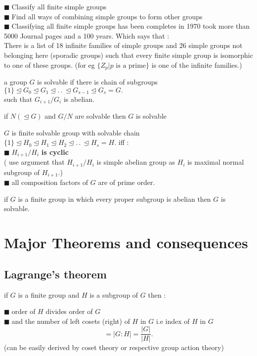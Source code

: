 \documentclass[11pt]{extarticle}
\newcommand{\w}[1]{\text{#1}}
\newcommand{\ck}{.\,.\,}
\newcommand{\snote}[1]{{\footnotesize(#1)}}
\newcommand{\y}{$\blacksquare\;$}
\newcommand{\tbx}[2][]{
	\begin{tcolorbox}[enhanced,breakable,size=small,colback=black!2!white,title={#1},arc is angular, arc=1.5mm,drop fuzzy shadow]
		#2
	\end{tcolorbox}
}
\begin{document}
\begin{multicols}{2}
{		
			\y  Classify all finite simple groups \\
			\y   Find all ways of combining simple groups to form other groups \\
			\y  Classifying all finite simple groups  has been completes in 1970 took more than 5000 Journal pages and a 100 years. Which says that : \\ 
			There is a list of 18 infinite families of simple groups and 26 simple groups not belonging here (sporadic groups)
			such that every finite simple group is isomorphic to  	one of these groups. (for eg $ \{Z_p|p \w{ is a prime}\} $ is one of the infinite families.)
		
	}
	
	
	\tbx[\textbf{Solvable Groups} ]{a group $ G $ is solvable if there is chain of subgroups \\
		$ \{1\} \trianglelefteq G_0\trianglelefteq G_1\trianglelefteq \ck \trianglelefteq G_{s-1}\trianglelefteq G_s =G.$ \\
		such that $ G_{i+1}/G_i $ is abelian.
	}
	\tbx{if $ N(\trianglelefteq G )$ and $ G/N $ are solvable then $ G $ is solvable  
	}
	\tbx{$G $ is finite solvable group with solvable chain 
		$ \{1\} \trianglelefteq H_0\trianglelefteq H_1\trianglelefteq H_{2} \trianglelefteq \ck \trianglelefteq H_s =H.$  iff : \\
		\y  $ H_{i+1}/H_i $ \textbf{is cyclic} 
		\\ \snote{ use argument that $ H_{i+1}/H_{i} $ is simple abelian group as $  
				H_{i}$ is maximal normal subgroup of $ H_{i+1} $.}\\
		\y   all composition factors of $ G $ are of prime order. 
	}
	\tbx{if $ G $ is a finite group in which every proper subgroup is abelian then $ G $ is solvable.}
	
	\section{Major Theorems and consequences}
	\subsection{Lagrange's theorem}
	\tbx[Theorem]{if $ G $ is a finite group and $ H $ is a subgroup of $ G $ 
		then :
		
			\y  order of $ H $ divides order of $ G $ \\
			\y   and the number of left cosets (right) of $ H $ in $ G $ i.e index of $ H $ in $ G $  
		\[=|G:H|= \frac{ |G|}{ |H| } .\]
			(can be easily derived by coset theory or respective group action theory)
		
}
\end{multicols}
\end{document}
